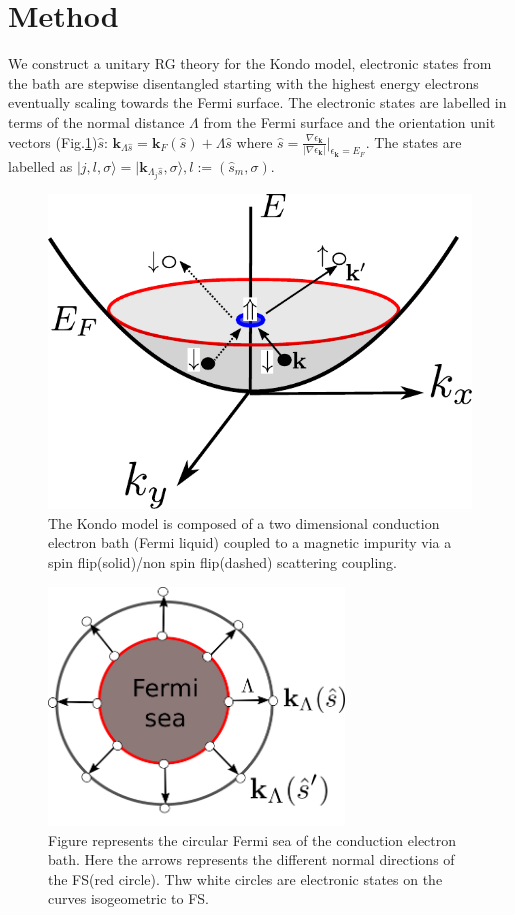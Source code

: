 \documentclass[aps,prl,preprint,groupedaddress]{revtex4-2}
\begin{document}
\section{Method}
\par\noindent
We construct a unitary RG theory for the Kondo model, electronic states from the bath are stepwise disentangled starting with the highest energy electrons eventually scaling towards the Fermi surface. The electronic states are labelled in terms of the normal distance $\Lambda$ from the Fermi surface and the orientation unit vectors (Fig.\ref{FSgeom})$\hat{s}$: $\mathbf{k}_{\Lambda\hat{s}}=\mathbf{k}_{F}(\hat{s})+\Lambda\hat{s}$ where $\hat{s}=\frac{\nabla\epsilon_{\mathbf{k}}}{|\nabla\epsilon_{\mathbf{k}}|}|_{\epsilon_{\mathbf{k}}=E_{F}}$. The states are labelled as
$|j,l,\sigma\rangle = |\mathbf{k}_{\Lambda_{j}\hat{s}},\sigma\rangle, l:=(\hat{s}_{m},\sigma)$. 
\begin{figure}
\includegraphics[scale=1]{kondoSetup.pdf}
\caption{The Kondo model is composed of a two dimensional conduction electron bath (Fermi liquid) coupled to a magnetic impurity via a spin flip(solid)/non spin flip(dashed) scattering coupling.}
\end{figure}
\begin{figure}
\includegraphics[width=0.7\textwidth]{2dKondoTN.png}
\caption{Figure represents the circular Fermi sea of the conduction electron bath. Here the arrows represents the different normal directions of the FS(red circle). Thw white circles are electronic states on the curves isogeometric to FS.}\label{FSgeom}
\end{figure}
\end{document}
